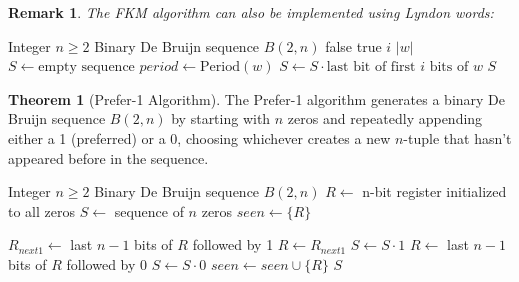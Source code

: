 \documentclass{article}
\newtheorem{remark}{Remark}
\theoremstyle{definition}
\newtheorem{theorem}{Theorem}
\begin{document}
\begin{remark}
The FKM algorithm can also be implemented using Lyndon words:
\end{remark}

\begin{algorithm}
\caption{Lyndon-based FKM Algorithm}
\begin{algorithmic}[1]
\Require Integer $n \geq 2$
\Ensure Binary De Bruijn sequence $B(2, n)$
            \State \Return false
        \EndIf
    \EndFor
    \State \Return true
\EndFunction
{}
         \Return $i$ \EndIf
    \EndFor
    \State \Return $|w|$
\EndFunction
\State $S \gets \text{empty sequence}$
        \State $period \gets \text{Period}(w)$
            \State $S \gets S \cdot \text{last bit of first } i \text{ bits of } w$
        \EndFor
    \EndIf
\EndFor
\State \Return $S$
\end{algorithmic}
\end{algorithm}

\begin{theorem}[Prefer-1 Algorithm]
The Prefer-1 algorithm generates a binary De Bruijn sequence $B(2, n)$ by starting with $n$ zeros and repeatedly appending either a 1 (preferred) or a 0, choosing whichever creates a new $n$-tuple that hasn't appeared before in the sequence.
\end{theorem}

\begin{algorithm}
\caption{Prefer-1 Algorithm for $B(2, n)$}
\begin{algorithmic}[1]
\Require Integer $n \geq 2$
\Ensure Binary De Bruijn sequence $B(2, n)$
\State $R \gets $ n-bit register initialized to all zeros
\State $S \gets $ sequence of $n$ zeros 
\State $seen \gets \{R\}$ 

    \State $R_{next1} \gets $ last $n-1$ bits of $R$ followed by 1
        \State $R \gets R_{next1}$ 
        \State $S \gets S \cdot 1$ 
    \Else
        \State $R \gets $ last $n-1$ bits of $R$ followed by 0 
        \State $S \gets S \cdot 0$ 
    \EndIf
    \State $seen \gets seen \cup \{R\}$
\EndWhile
\State \Return $S$
\end{algorithmic}
\end{algorithm}
\end{document}
